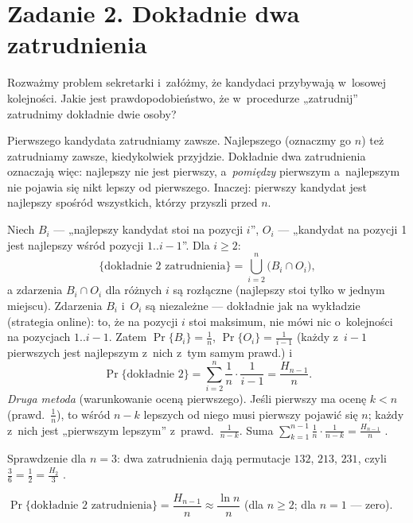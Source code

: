 \documentclass[11pt]{article}
\begin{document}
\section{Zadanie 2. Dokładnie dwa zatrudnienia}
\begin{tresc}
Rozważmy problem sekretarki i~załóżmy, że kandydaci przybywają w~losowej
kolejności. Jakie jest prawdopodobieństwo, że w~procedurze „zatrudnij”
zatrudnimy dokładnie dwie osoby?
\end{tresc}

\begin{intuicja}
Pierwszego kandydata zatrudniamy zawsze. Najlepszego (oznaczmy go $n$) też
zatrudniamy zawsze, kiedykolwiek przyjdzie. Dokładnie dwa zatrudnienia
oznaczają więc: najlepszy nie jest pierwszy, a~\emph{pomiędzy} pierwszym
a~najlepszym nie pojawia się nikt lepszy od pierwszego. Inaczej: pierwszy
kandydat jest najlepszy spośród wszystkich, którzy przyszli przed $n$.
\end{intuicja}
\formalnie
Niech $B_i$ --- „najlepszy kandydat stoi na pozycji $i$”, $O_i$ --- „kandydat
na pozycji 1 jest najlepszy wśród pozycji $1..i-1$”. Dla $i\ge2$:
\[
\{\text{dokładnie 2 zatrudnienia}\}=\bigcup_{i=2}^{n}\bigl(B_i\cap O_i\bigr),
\]
a zdarzenia $B_i\cap O_i$ dla różnych $i$ są rozłączne (najlepszy stoi tylko
w jednym miejscu). Zdarzenia $B_i$ i~$O_i$ są niezależne --- dokładnie jak
na wykładzie (strategia online): to, że na pozycji $i$ stoi maksimum, nie mówi
nic o~kolejności na pozycjach $1..i-1$. Zatem
$\Pr\{B_i\}=\frac1n$, $\Pr\{O_i\}=\frac1{i-1}$ (każdy z~$i-1$ pierwszych jest
najlepszym z~nich z~tym samym prawd.) i
\[
\Pr\{\text{dokładnie 2}\}=\sum_{i=2}^{n}\frac1n\cdot\frac1{i-1}=\frac{H_{n-1}}{n}.
\]
\emph{Druga metoda} (warunkowanie oceną pierwszego). Jeśli pierwszy ma ocenę
$k<n$ (prawd.\ $\frac1n$), to wśród $n-k$ lepszych od niego musi pierwszy
pojawić się $n$; każdy z~nich jest „pierwszym lepszym” z~prawd.\ $\frac{1}{n-k}$.
Suma $\sum_{k=1}^{n-1}\frac1n\cdot\frac1{n-k}=\frac{H_{n-1}}n$ \checkmark.

Sprawdzenie dla $n=3$: dwa zatrudnienia dają permutacje $132$, $213$, $231$,
czyli $\frac36=\frac12=\frac{H_2}{3}$ \checkmark.
\begin{odpowiedz}
$\Pr\{\text{dokładnie 2 zatrudnienia}\}=\dfrac{H_{n-1}}{n}\approx\dfrac{\ln n}{n}$ (dla $n\ge2$; dla $n=1$ --- zero).
\end{odpowiedz}

\end{document}
